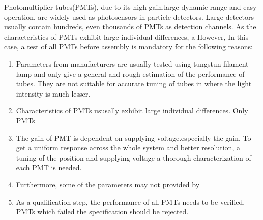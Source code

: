 \documentclass[5p, times]{elsarticle}
\begin{document}
Photomultiplier tubes(PMTs), due to its high gain,large dynamic range and easy-operation, are widely used as photosensors in particle detectors.
Large detectors usually contain hundreds, even thousands of PMTs as detection channels.
As the characteristics of PMTs exhibit large individual differences, a
However, 
In this case, a test of all PMTs before assembly is mandatory for the following reasons:
\begin{enumerate}
 \item Parameters from manufacturers are usually tested using tungstun filament lamp and only give a general and rough estimation of the performance of tubes.
 They are not suitable for accurate tuning of tubes in  where the light intensity is much lesser.
 \item Characteristics of PMTs ususally exhibit large individual differences.
 Only PMTs 
 \item The gain of PMT is dependent on supplying voltage.especially the gain.
 To get a uniform response across the whole system and better resolution, a tuning of the position and supplying voltage a thorough characterization of each PMT is needed.
 \item Furthermore, some of the parameters may not provided by 
 \item As a qualification step, the performance of all PMTs needs to be verified.
 PMTs which failed the specification should be rejected.
\end{enumerate}
\end{document}
